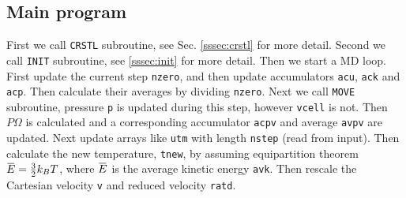 
\subsection{Main program}

First we call \texttt{CRSTL} subroutine, see Sec. \ref{sssec:crstl} for more detail.
Second we call \texttt{INIT} subroutine, see \ref{sssec:init} for more detail.
Then we start a MD loop.
First update the current step \texttt{nzero}, and then update
accumulators \texttt{acu}, \texttt{ack} and \texttt{acp}. Then calculate
their averages by dividing \texttt{nzero}. Next we call \texttt{MOVE} subroutine,
pressure \texttt{p} is updated during this step, however \texttt{vcell} is not.
Then $P \Omega$ is calculated and a corresponding accumulator \texttt{acpv} and
average \texttt{avpv} are updated. Next update arrays like \texttt{utm} with length
\texttt{nstep} (read from input).
Then calculate the new temperature, \texttt{tnew}, by assuming equipartition
theorem $\mean{E} = \frac{ 3 }{ 2 } k_B T$, where $\mean{E}$ is
the average kinetic energy \texttt{avk}.
Then rescale the Cartesian velocity \texttt{v} and reduced velocity
\texttt{ratd}.

